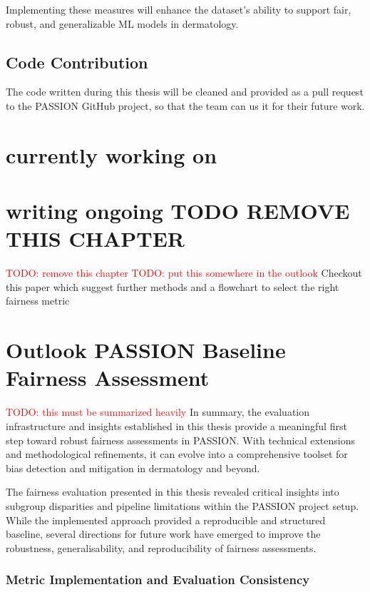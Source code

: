 \documentclass[12pt, a4paper, oneside]{book}   	%
\renewcommand{\todo}[1]{\textcolor{red}{TODO: #1}}
\begin{document}
		Implementing these measures will enhance the dataset’s ability to support fair, robust, and generalizable \gls{ML} models in dermatology.
	
		\section{Code Contribution}
		The code written during this thesis will be cleaned and provided as a pull request to the PASSION GitHub project, so that the team can us it for their future work.
	
	\chapter{currently working on}
	
	

	\chapter{writing ongoing TODO REMOVE THIS CHAPTER}\todo{remove this chapter}
	\todo{put this somewhere in the outlook} Checkout this paper which suggest further methods and a flowchart to select the right fairness metric \textcite{Barr_2025}
	
	
	\chapter{Outlook PASSION Baseline Fairness Assessment}
	\todo{this must be summarized heavily}
	In summary, the evaluation infrastructure and insights established in this thesis provide a meaningful first step toward robust fairness assessments in PASSION. With technical extensions and methodological refinements, it can evolve into a comprehensive toolset for bias detection and mitigation in dermatology and beyond.
	
	The fairness evaluation presented in this thesis revealed critical insights into subgroup disparities and pipeline limitations within the PASSION project setup. While the implemented approach provided a reproducible and structured baseline, several directions for future work have emerged to improve the robustness, generalisability, and reproducibility of fairness assessments.
	
	\subsection{Metric Implementation and Evaluation Consistency}
	
\end{document}
